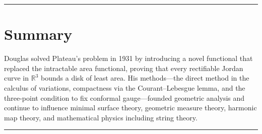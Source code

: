 \begin{center}\rule{0.5\linewidth}{0.5pt}\end{center}

\section*{Summary}

Douglas solved Plateau's problem in 1931 by introducing a novel
functional that replaced the intractable area functional, proving that
every rectifiable Jordan curve in $\mathbb{R}^3$ bounds a disk of least
area. His methods---the direct method in the calculus of variations,
compactness via the Courant--Lebesgue lemma, and the three-point
condition to fix conformal gauge---founded geometric analysis and
continue to influence minimal surface theory, geometric measure theory,
harmonic map theory, and mathematical physics including string theory.

\begin{center}\rule{0.5\linewidth}{0.5pt}\end{center}
